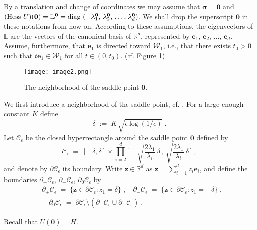 \documentclass[reqno]{amsart}
\newcounter{as}[section]
\newcommand{\mc}[1]{{\mathcal #1}}
\newcommand{\bb}[1]{{\mathbb #1}}
\newcommand{\bs}[1]{{\boldsymbol #1}}
\newcommand{\<}{\langle}
\renewcommand{\>}{\rangle}
\begin{document}
By a translation and change of coordinates we may assume that
$\bs{\sigma}=\bs{0}$ and $(\textup{Hess }U) (\bs{0})=\bb{L}^{\bs 0} =
\textup{diag }(-\lambda_{1}^{\bs 0},\,\lambda_{2}^{\bs
  0},\,\dots,\,\lambda_{d}^{\bs 0})$. We shall drop the superscript
$\bs{0}$ in these notations from now on.  According to these
assumptions, the eigenvectors of $\bb{L}$ are the vectors of the
canonical basis of $\bb R^d$, represented by
$\bs{e}_{1},\,\bs{e}_{2},\,\dots,\,\bs{e}_{d}$. Assume, furthermore,
that $\bs{e}_{1}$ is directed toward $\mc{W}_{1}$, i.e., that there
exists $t_{0}>0$ such that $t\bs{e}_{1}\in\mc{W}_{1}$ for all
$t\in(0,t_{0})$. (cf. Figure \ref{fig2})

\begin{figure}
  \protect
\texttt{[image: image2.png]}\protect
  \caption{\label{fig2} The neighborhood of the saddle point $\bs{0}$.}
\end{figure}



\smallskip{}  We first
introduce a neighborhood of the saddle point, cf. \cite{LS1}.
For a large enough constant $K$ define
\begin{equation}
\label{ins01}
\delta\;:=\; K \, \sqrt{\epsilon\log(1/\epsilon)}\;.
\end{equation}
Let $\mc{C}_{\epsilon}$ be the closed hyperrectangle around the saddle
point $\bs{0}$ defined by
\begin{equation*}
\mc{C}_{\epsilon}\;=\;\left[-\delta,\delta\right]\times
\prod_{i=2}^{d}\Big[-\sqrt{\frac{2\lambda_{1}}{\lambda_{i}}}\,
\delta \,,\,\sqrt{\frac{2\lambda_{1}}{\lambda_{i}}}\, \delta\,
\Big]\;,
\end{equation*}
and denote by $\partial\mc{C}_{\epsilon}$ its boundary. Write
$\bs{z}\in\bb{R}^{d}$ as $\bs{z}=\sum_{i=1}^{d}z_{i}\bs{e}_{i}$, and
define the boundaries $\partial_{-}\mc{C}_{\epsilon}$,
$\partial_{+}\mc{C}_{\epsilon}$, $\partial_{0}\mc{C}_{\epsilon}$ by
\begin{align*}
& \partial_{+}\mc{C}_{\epsilon} \;=\; \{
\bs{z}\in\partial\mc{C}_{\epsilon}:
z_{1}=\delta\} \;,\quad \partial_{-}\mc{C}_{\epsilon}\;=\;
\{ \bs{z}\in\partial\mc{C}_{\epsilon}:z_{1}=-\delta\} \;,\\
& \quad\partial_{0}\mc{C}_{\epsilon}\;=\;\partial\mc{C}_{\epsilon}
\setminus (\partial_{-}\mc{C}_{\epsilon}\cup\partial_{+}\mc{C}_{\epsilon})\;.
\end{align*}

Recall that $U(\bs{0})=H$.
\end{document}
